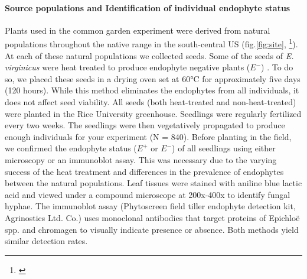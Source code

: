 \documentclass[12pt]{article}\usepackage[]{graphicx}\usepackage[dvipsnames]{xcolor}
\newcommand{\jacob}[2]{{\color{blue}{#1}}\footnote{\textit{\color{blue}{#2}}}}
\begin{document}
\paragraph {Source populations and Identification of individual endophyte status} 
Plants used  in the common garden experiment were derived from natural populations throughout the native range in the south-central US (fig.\ref{fig:site}, \jacob{Table X}{We need this table  in the Appendix}). 
At each of these natural populations we collected seeds. 
Some of the seeds of \emph{E. virginicus} were heat treated to produce endophyte negative plants ($E^-$) . 
To do so, we placed these seeds  in a drying oven set at 60°C for approximately five days (120 hours). 
While this method eliminates the endophytes from all individuals, it does not affect seed viability. 
All seeds (both heat-treated and non-heat-treated) were planted in the Rice University greenhouse.
Seedlings were regularly fertilized every two weeks. 
The seedlings were then vegetatively propagated to produce enough individuals for your experiment (N = 840).
Before planting in the field, we confirmed the endophyte status ($E^+$ or $E^-$) of all  seedlings using either microscopy or an immunoblot assay. 
This was necessary due to the varying success of the heat treatment and differences in the prevalence of endophytes between the natural populations. 
Leaf tissues were stained with aniline blue lactic acid and viewed under a compound microscope at 200x-400x to identify fungal hyphae. 
The immunoblot assay (Phytoscreen field tiller endophyte detection kit, Agrinostics Ltd. Co.) uses monoclonal antibodies that target proteins of Epichloë spp. and chromagen to visually indicate presence or absence. Both methods yield similar detection rates.  
\end{document}
